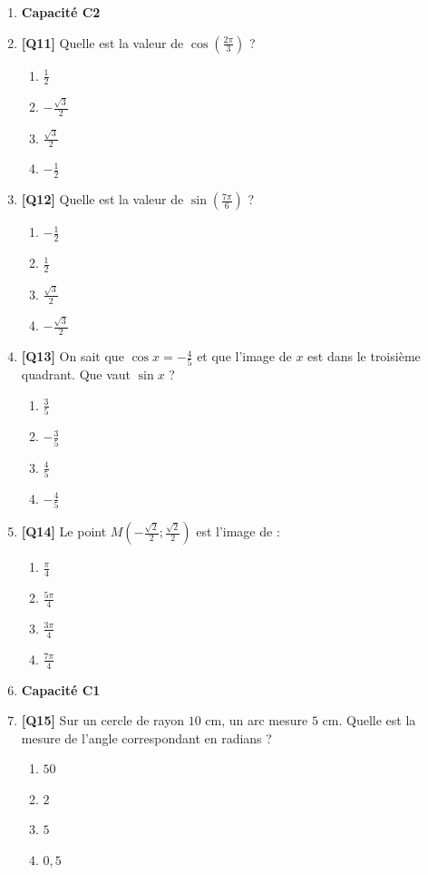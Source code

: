 \begin{enumerate}
\item[] \textbf{Capacité C2}

\item \textbf{[Q11]} Quelle est la valeur de $\cos\left(\frac{2\pi}{3}\right)$ ?
  \begin{enumerate}[label=\Alph*.]
    \item $\frac{1}{2}$
    \item $-\frac{\sqrt{3}}{2}$
    \item $\frac{\sqrt{3}}{2}$
    \item $-\frac{1}{2}$
  \end{enumerate}

\item \textbf{[Q12]} Quelle est la valeur de $\sin\left(\frac{7\pi}{6}\right)$ ?
  \begin{enumerate}[label=\Alph*.]
    \item $-\frac{1}{2}$
    \item $\frac{1}{2}$
    \item $\frac{\sqrt{3}}{2}$
    \item $-\frac{\sqrt{3}}{2}$
  \end{enumerate}

\item \textbf{[Q13]} On sait que $\cos x=-\frac45$ et que l'image de $x$ est dans le troisième quadrant. Que vaut $\sin x$ ?
  \begin{enumerate}[label=\Alph*.]
    \item $\frac35$
    \item $-\frac35$
    \item $\frac45$
    \item $-\frac45$
  \end{enumerate}

\item \textbf{[Q14]} Le point $M\left(-\frac{\sqrt2}{2};\frac{\sqrt2}{2}\right)$ est l'image de :
  \begin{enumerate}[label=\Alph*.]
    \item $\frac{\pi}{4}$
    \item $\frac{5\pi}{4}$
    \item $\frac{3\pi}{4}$
    \item $\frac{7\pi}{4}$
  \end{enumerate}

\item[] \textbf{Capacité C1}

\item \textbf{[Q15]} Sur un cercle de rayon $10$ cm, un arc mesure $5$ cm. Quelle est la mesure de l'angle correspondant en radians ?
  \begin{enumerate}[label=\Alph*.]
    \item $50$
    \item $2$
    \item $5$
    \item $0{,}5$
  \end{enumerate}

\end{enumerate}

